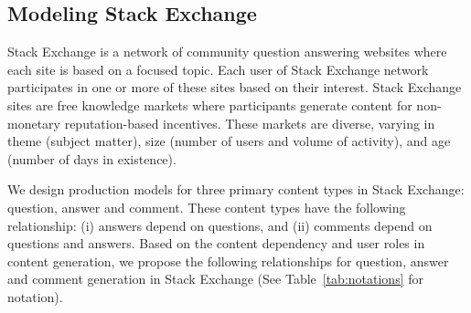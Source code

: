 \subsection{Modeling Stack Exchange}
Stack Exchange is a network of community question answering websites where each site is based on a focused topic. Each user of Stack Exchange network participates in one or more of these sites based on their interest. Stack Exchange sites are free knowledge markets where participants generate content for non-monetary reputation-based incentives. These markets are diverse, varying in theme (subject matter), size (number of users and volume of activity), and age (number of days in existence). 

We design production models for three primary content types in Stack Exchange: question, answer and comment. These content types have the following relationship: (i) answers depend on questions, and (ii) comments depend on questions and answers. Based on the content dependency and user roles in content generation, we propose the following relationships for question, answer and comment generation in Stack Exchange (See Table~\ref{tab:notations} for notation).

